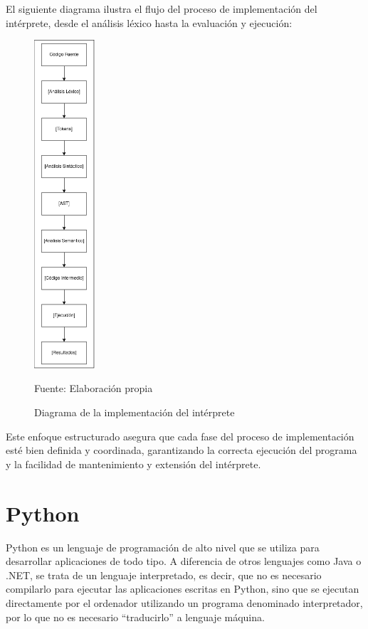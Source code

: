 El siguiente diagrama ilustra el flujo del proceso de implementación del intérprete, desde el análisis léxico hasta la evaluación y ejecución:
\begin{figure}[!h]
  \centering
  \includegraphics[width=0.2\textwidth]{images/flujo_interprete.png}
  \caption{Diagrama de la implementación del intérprete}
  \centering Fuente: Elaboración propia
  \label{fig:flujo_interprete}
\end{figure}
\newpage
Este enfoque estructurado asegura que cada fase del proceso de implementación esté bien definida y coordinada, garantizando la correcta ejecución del programa y la facilidad de mantenimiento y extensión del intérprete.

\section{Python}
Python es un lenguaje de programación de alto nivel que se utiliza para desarrollar aplicaciones de todo tipo. A diferencia de otros lenguajes como Java o .NET, se trata de un lenguaje interpretado, es decir, que no es necesario compilarlo para ejecutar las aplicaciones escritas en Python, sino que se ejecutan directamente por el ordenador utilizando un programa denominado interpretador, por lo que no es necesario “traducirlo” a lenguaje máquina. \parencite{SantanderUniversidades2021}

